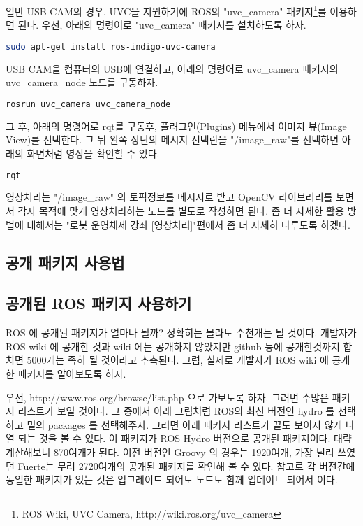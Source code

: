 일반 USB CAM의 경우, UVC을 지원하기에 ROS의 "uvc\_camera" 패키지\footnote{ROS Wiki, UVC Camera, http://wiki.ros.org/uvc\_camera}를 이용하면 된다. 우선, 아래의 명령어로 "uvc\_camera" 패키지를 설치하도록 하자.

\begin{lstlisting}[language=bash]
sudo apt-get install ros-indigo-uvc-camera 
\end{lstlisting}

USB CAM을 컴퓨터의 USB에 연결하고, 아래의 명령어로 uvc\_camera 패키지의 uvc\_camera\_node 노드를 구동하자.

\begin{lstlisting}[language=bash]
rosrun uvc_camera uvc_camera_node
\end{lstlisting}

그 후, 아래의 명령어로 rqt를 구동후, 플러그인(Plugins) 메뉴에서 이미지 뷰(Image View)를 선택한다. 그 뒤 왼쪽 상단의 메시지 선택란을 "/image\_raw"를 선택하면 아래의 화면처럼 영상을 확인할 수 있다. 

\begin{lstlisting}[language=bash]
rqt
\end{lstlisting}

영상처리는 "/image\_raw" 의 토픽정보를 메시지로 받고 OpenCV 라이브러리를 보면서 각자 목적에 맞게 영상처리하는 노드를 별도로 작성하면 된다. 좀 더 자세한 활용 방법에 대해서는 "로봇 운영체제 강좌 [영상처리]"편에서 좀 더 자세히 다루도록 하겠다.

\subsection{공개 패키지 사용법}

\subsection{공개된 ROS 패키지 사용하기}

ROS 에 공개된 패키지가 얼마나 될까? 정확히는 몰라도 수천개는 될 것이다. 개발자가 ROS wiki 에 공개한 것과 wiki 에는 공개하지 않았지만 github 등에 공개한것까지 합치면 5000개는 족히 될 것이라고 추측된다. 그럼, 실제로 개발자가 ROS wiki 에 공개한 패키지를 알아보도록 하자.

우선, http://www.ros.org/browse/list.php 으로 가보도록 하자. 그러면 수많은 패키지 리스트가 보일 것이다. 그 중에서 아래 그림처럼 ROS의 최신 버전인 hydro 를 선택하고 밑의 packages 를 선택해주자. 그러면 아래 패키지 리스트가 끝도 보이지 않게 나열 되는 것을 볼 수 있다. 이 패키지가 ROS Hydro 버전으로 공개된 패키지이다. 대략 계산해보니  870여개가 된다. 이전 버전인 Groovy 의 경우는 1920여개, 가장 널리 쓰였던 Fuerte는 무려 2720여개의 공개된 패키지를 확인해 볼 수 있다. 참고로 각 버전간에 동일한 패키지가 있는 것은 업그레이드 되어도 노드도 함께 업데이트 되어서 이다.

